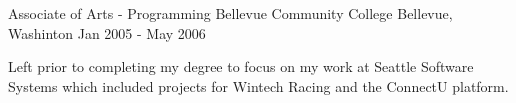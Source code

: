 

\begin{cventries}

  \cventry
      {Associate of Arts - Programming} %
      {Bellevue Community College} %
      {Bellevue, Washinton} %
      {Jan 2005 - May 2006} %
      {
        \begin{cvitems} %
        \item {Left prior to completing my degree to focus on my work at Seattle Software Systems which included projects for Wintech Racing and the ConnectU platform.}
        \end{cvitems}
      }

      \end{cventries}
